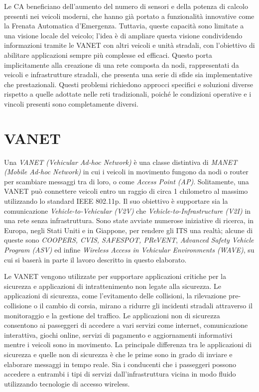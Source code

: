 Le CA beneficiano dell'aumento del numero di sensori e della potenza di calcolo presenti nei veicoli moderni, che hanno già portato a funzionalità innovative come la Frenata Automatica d'Emergenza. Tuttavia, queste capacità sono limitate a una visione locale del veicolo; l'idea è di ampliare questa visione condividendo informazioni tramite le VANET con altri veicoli e unità stradali, con l'obiettivo di abilitare applicazioni sempre più complesse ed efficaci. 
Questo porta implicitamente alla creazione di una rete composta da nodi, rappresentati da veicoli e infrastrutture stradali, che presenta una serie di sfide sia implementative che prestazionali. Questi problemi richiedono approcci specifici e soluzioni diverse rispetto a quelle adottate nelle reti tradizionali, poiché le condizioni operative e i vincoli presenti sono completamente diversi.

\section{VANET}
Una \textit{VANET (Vehicular Ad-hoc Network)} è una classe distintiva di \textit{MANET (Mobile Ad-hoc Network)} in cui i veicoli in movimento fungono da nodi o router per scambiare messaggi tra di loro, o come \textit{Access Point (AP)}. Solitamente, una VANET può connettere veicoli entro un raggio di circa 1 chilometro al massimo utilizzando lo standard IEEE 802.11p. Il suo obiettivo è supportare sia la comunicazione \textit{Vehicle-to-Vehicular (V2V)} che \textit{Vehicle-to-Infrastructure (V2I)} in una rete senza infrastruttura. Sono state avviate numerose iniziative di ricerca, in Europa, negli Stati Uniti e in Giappone, per rendere gli ITS una realtà; alcune di queste sono \textit{COOPERS, CVIS, SAFESPOT, PReVENT}, \textit{Advanced Safety Vehicle Program (ASV)} ed infine \textit{Wireless Access in Vehicular Environments (WAVE)}, su cui si baserà in parte il lavoro descritto in questo elaborato.

Le VANET vengono utilizzate per supportare applicazioni critiche per la sicurezza e applicazioni di intrattenimento non legate alla sicurezza. Le applicazioni di sicurezza, come l'evitamento delle collisioni, la rilevazione pre-collisione o il cambio di corsia, mirano a ridurre gli incidenti stradali attraverso il monitoraggio e la gestione del traffico. Le applicazioni non di sicurezza consentono ai passeggeri di accedere a vari servizi come internet, comunicazione interattiva, giochi online, servizi di pagamento e aggiornamenti informativi mentre i veicoli sono in movimento. La principale differenza tra le applicazioni di sicurezza e quelle non di sicurezza è che le prime sono in grado di inviare e elaborare messaggi in tempo reale. Sia i conducenti che i passeggeri possono accedere a entrambi i tipi di servizi dall'infrastruttura vicina in modo fluido utilizzando tecnologie di accesso wireless.


